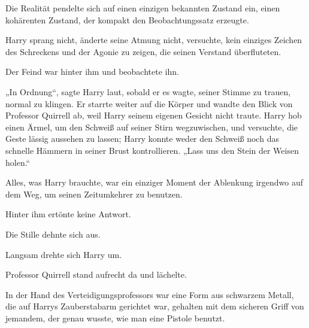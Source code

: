 Die Realität pendelte sich auf einen einzigen bekannten Zustand ein, einen kohärenten Zustand, der kompakt den Beobachtungssatz erzeugte.

Harry sprang nicht, änderte seine Atmung nicht, versuchte, kein einziges Zeichen des Schreckens und der Agonie zu zeigen, die seinen Verstand überfluteten.

Der Feind war hinter ihm und beobachtete ihn.

„In Ordnung“, sagte Harry laut, sobald er es wagte, seiner Stimme zu trauen, normal zu klingen. Er starrte weiter auf die Körper und wandte den Blick von Professor Quirrell ab, weil Harry seinem eigenen Gesicht nicht traute. Harry hob einen Ärmel, um den Schweiß auf seiner Stirn wegzuwischen, und versuchte, die Geste lässig aussehen zu lassen; Harry konnte weder den Schweiß noch das schnelle Hämmern in seiner Brust kontrollieren.
„Lass uns den Stein der Weisen holen.“

Alles, was Harry brauchte, war ein einziger Moment der Ablenkung irgendwo auf dem Weg, um seinen Zeitumkehrer zu benutzen.

Hinter ihm ertönte keine Antwort.

Die Stille dehnte sich aus.

Langsam drehte sich Harry um.

Professor Quirrell stand aufrecht da und lächelte.

In der Hand des Verteidigungsprofessors war eine Form aus schwarzem Metall, die auf Harrys Zauberstabarm gerichtet war, gehalten mit dem sicheren Griff von jemandem, der genau wusste, wie man eine Pistole benutzt.


